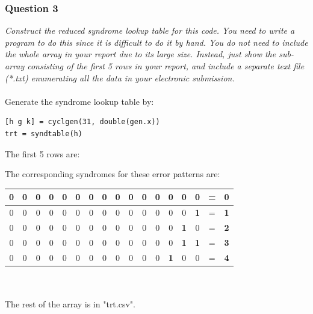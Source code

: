 \documentclass[a4paper]{article}
\begin{document}
\subsubsection*{Question 3} \textit{Construct the reduced syndrome lookup table for this code. You need to write a program to do this since it is difficult to do it by hand. You do not need to include the whole array in your report due to its large size. Instead, just show the sub-array consisting of the first 5 rows in your report, and include a separate text file (*.txt) enumerating all the data in your electronic submission.} \\
\\
Generate the syndrome lookup table by:
\begin{lstlisting}
[h g k] = cyclgen(31, double(gen.x))
trt = syndtable(h)
\end{lstlisting}

The first 5 rows are:\\

The corresponding syndromes for these error patterns are:\\
\begin{tabular}{| *{15}{c} | c c |}
\hline
0 & 0 & 0 & 0 & 0 & 0 & 0 & 0 & 0 & 0 & 0 & 0 & 0 & 0 & 0 & = & \textbf{0}  \\
\hline
0 & 0 & 0 & 0 & 0 & 0 & 0 & 0 & 0 & 0 & 0 & 0 & 0 & 0 & \textbf{1} & = & \textbf{1}  \\
\hline
0 & 0 & 0 & 0 & 0 & 0 & 0 & 0 & 0 & 0 & 0 & 0 & 0 & \textbf{1} & 0 & = & \textbf{2}  \\
\hline
0 & 0 & 0 & 0 & 0 & 0 & 0 & 0 & 0 & 0 & 0 & 0 & 0 & \textbf{1} & \textbf{1} & = & \textbf{3}  \\
\hline
0 & 0 & 0 & 0 & 0 & 0 & 0 & 0 & 0 & 0 & 0 & 0 & \textbf{1} & 0 & 0 & = & \textbf{4}  \\
\hline
\end{tabular}\\
\\
The rest of the array is in "trt.csv".
\end{document}
